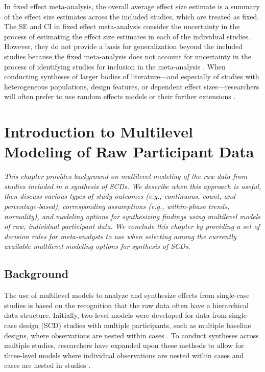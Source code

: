 \documentclass[
]{book}
\begin{document}
In fixed effect meta-analysis, the overall average effect size estimate is a summary of the effect size estimates across the included studies, which are treated as fixed. The SE and CI in fixed effect meta-analysis consider the uncertainty in the process of estimating the effect size estimates in each of the individual studies. However, they do not provide a basis for generalization beyond the included studies because the fixed meta-analysis does not account for uncertainty in the process of identifying studies for inclusion in the meta-analysis \citep{konstantopoulos2019statistically, Rice_Higgins_Lumley_2018}. When conducting syntheses of larger bodies of literature---and especially of studies with heterogeneous populations, design features, or dependent effect sizes---researchers will often prefer to use random effects models \citep{Hedges_Vevea_1998} or their further extensions \citep{PustejovskyTipton2021, van2013three}.

\hypertarget{MLM-raw-data}{%
\chapter{Introduction to Multilevel Modeling of Raw Participant Data}\label{MLM-raw-data}}


\emph{This chapter provides background on multilevel modeling of the raw data from studies included in a synthesis of SCDs.
We describe when this approach is useful, then discuss various types of study outcomes (e.g., continuous, count, and percentage-based), corresponding assumptions (e.g., within-phase trends, normality), and modeling options for synthesizing findings using multilevel models of raw, individual participant data.
We conclude this chapter by providing a set of decision rules for meta-analysts to use when selecting among the currently available multilevel modeling options for synthesis of SCDs.}

\hypertarget{background-2}{%
\section{Background}\label{background-2}}

The use of multilevel models to analyze and synthesize effects from single-case studies is based on the recognition that the raw data often have a hierarchical data structure.
Initially, two-level models were developed for data from single-case design (SCD) studies with multiple participants, such as multiple baseline designs, where observations are nested within cases \citep{Ferron_Bell_Hess_Rendina-Gobioff_Hibbard_2009, Shadish_Kyse_Rindskopf_2013, van2003combining}.
To conduct syntheses across multiple studies, researchers have expanded upon these methods to allow for three-level models where individual observations are nested within cases and cases are nested in studies \citep{Moeyaert_Ferron_Beretvas_VandenNoortgate_2014, Moeyaert_Ugille_Ferron_Beretvas_VandenNoortgate_2014, Owens_Ferron_2012, VandenNoortgate2008multilevel}.
\end{document}
